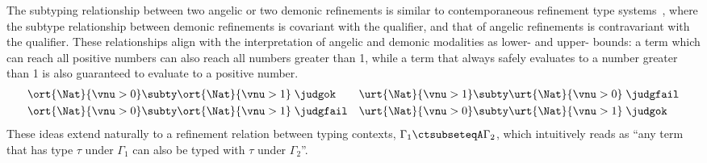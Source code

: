 The subtyping relationship between two angelic or two demonic
refinements is similar to contemporaneous refinement type
systems~\cite{LiquidHaskell, CoverageType}, where the subtype
relationship between demonic refinements is covariant with the
qualifier, and that of angelic refinements is contravariant with the
qualifier. These relationships align with the interpretation of
angelic and demonic modalities as lower- and upper- bounds: a term
which can reach all positive numbers can also reach all numbers
greater than 1, while a term that always safely evaluates to a number
greater than 1 is also guaranteed to evaluate to a positive number.
\begin{align*}
  &\ort{\Nat}{\vnu > 0} \subty \ort{\Nat}{\vnu > 1}\;\judgok
  &&\urt{\Nat}{\vnu > 1} \subty \urt{\Nat}{\vnu > 0} \;\judgfail \\
  & \ort{\Nat}{\vnu > 0} \subty \ort{\Nat}{\vnu > 1}  \;\judgfail
  && \urt{\Nat}{\vnu > 0} \subty \urt{\Nat}{\vnu > 1}\;\judgok
\end{align*} %
\noindent These ideas extend naturally to a refinement relation
between typing contexts, $\Gamma_1 \ctsubseteqA \Gamma_2$, which
intuitively reads as ``any term that has type $\tau$ under $\Gamma_1$
can also be typed with $\tau$ under $\Gamma_2$''.

